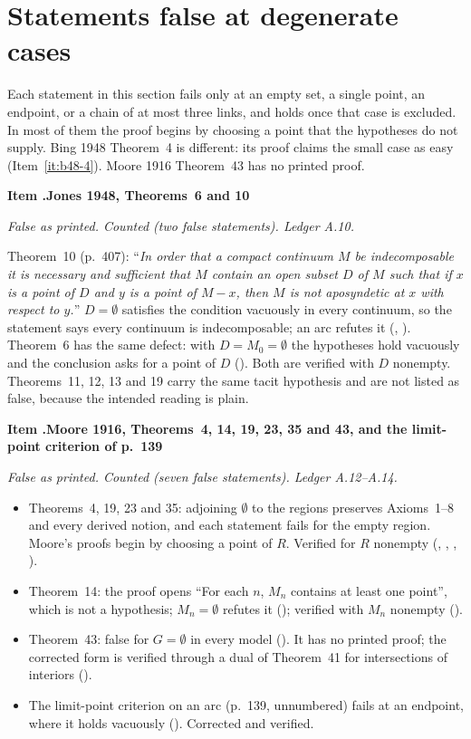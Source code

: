 \documentclass[11pt]{article}
\newcounter{defect}
\newenvironment{defect}[4]{%
  \par\addvspace{10pt}\refstepcounter{defect}%
  \noindent\textbf{Item \thedefect.\enspace #1}\par\nopagebreak
  \noindent\textit{#2}\par\nopagebreak\smallskip}{\par\addvspace{6pt}}
\begin{document}
\section{Statements false at degenerate cases}\label{sec:degenerate}

Each statement in this section fails only at an empty set, a single point, an endpoint, or a
chain of at most three links, and holds once that case is excluded. In most of them the proof
begins by choosing a point that the hypotheses do not supply. Bing 1948 Theorem~4 is different: its
proof claims the small case as easy (Item~\ref{it:b48-4}). Moore 1916 Theorem~43 has no printed
proof.

\begin{defect}{Jones 1948, Theorems~6 and 10}{False as printed. Counted (two false statements).
Ledger A.10.}{2}{0}\label{it:j48}
Theorem~10 (p.~407): ``\emph{In order that a compact continuum $M$ be indecomposable it is
necessary and sufficient that $M$ contain an open subset $D$ of $M$ such that if $x$ is a point of
$D$ and $y$ is a point of $M-x$, then $M$ is not aposyndetic at $x$ with respect to $y$.}''
$D=\emptyset$ satisfies the condition vacuously in every continuum, so the statement says every continuum is indecomposable; an arc refutes it
(, ). Theorem~6 has the same
defect: with $D=M_0=\emptyset$ the hypotheses hold vacuously and the conclusion asks for a point of
$D$ (). Both are verified with $D$ nonempty. Theorems~11, 12, 13 and 19
carry the same tacit hypothesis and are not listed as false, because the intended reading is plain.
\end{defect}

\begin{defect}{Moore 1916, Theorems~4, 14, 19, 23, 35 and 43, and the limit-point criterion of
p.~139}{False as printed. Counted (seven false statements). Ledger A.12--A.14.}{7}{0}\label{it:m16-degen}
\begin{itemize}
\item Theorems~4, 19, 23 and 35: adjoining $\emptyset$ to the regions preserves Axioms~1--8 and
  every derived notion, and each statement fails for the empty region. Moore's proofs begin by
  choosing a point of $R$. Verified for $R$ nonempty (, ,
  , ).
\item Theorem~14: the proof opens ``For each $n$, $M_n$ contains at least one point'', which is not
  a hypothesis; $M_n=\emptyset$ refutes it (); verified with $M_n$
  nonempty ().
\item Theorem~43: false for $G=\emptyset$ in every model (). It has no
  printed proof; the corrected form is verified through a dual of Theorem~41 for intersections of
  interiors ().
\item The limit-point criterion on an arc (p.~139, unnumbered) fails at an endpoint, where it holds
  vacuously (). Corrected and verified.
\end{itemize}
\end{defect}
\end{document}
